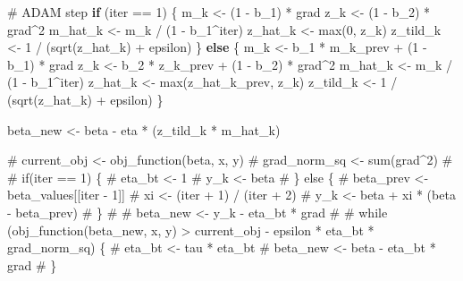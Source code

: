 \documentclass[
  letterpaper,
  DIV=11,
  numbers=noendperiod]{scrartcl}
\newenvironment{Shaded}{\begin{snugshade}}{\end{snugshade}}
\newcommand{\CommentTok}[1]{\textcolor[rgb]{0.37,0.37,0.37}{#1}}
\newcommand{\ControlFlowTok}[1]{\textcolor[rgb]{0.00,0.23,0.31}{\textbf{#1}}}
\newcommand{\DecValTok}[1]{\textcolor[rgb]{0.68,0.00,0.00}{#1}}
\newcommand{\FunctionTok}[1]{\textcolor[rgb]{0.28,0.35,0.67}{#1}}
\newcommand{\NormalTok}[1]{\textcolor[rgb]{0.00,0.23,0.31}{#1}}
\newcommand{\OtherTok}[1]{\textcolor[rgb]{0.00,0.23,0.31}{#1}}
\newcommand{\SpecialCharTok}[1]{\textcolor[rgb]{0.37,0.37,0.37}{#1}}
\begin{document}
\begin{Shaded}
\begin{Highlighting}[]
    \CommentTok{\# ADAM step}
    \ControlFlowTok{if}\NormalTok{ (iter }\SpecialCharTok{==} \DecValTok{1}\NormalTok{) \{}
\NormalTok{      m\_k }\OtherTok{\textless{}{-}}\NormalTok{ (}\DecValTok{1} \SpecialCharTok{{-}}\NormalTok{ b\_1) }\SpecialCharTok{*}\NormalTok{ grad}
\NormalTok{      z\_k }\OtherTok{\textless{}{-}}\NormalTok{ (}\DecValTok{1} \SpecialCharTok{{-}}\NormalTok{ b\_2) }\SpecialCharTok{*}\NormalTok{ grad}\SpecialCharTok{\^{}}\DecValTok{2}
\NormalTok{      m\_hat\_k }\OtherTok{\textless{}{-}}\NormalTok{ m\_k }\SpecialCharTok{/}\NormalTok{ (}\DecValTok{1} \SpecialCharTok{{-}}\NormalTok{ b\_1}\SpecialCharTok{\^{}}\NormalTok{iter)}
\NormalTok{      z\_hat\_k }\OtherTok{\textless{}{-}} \FunctionTok{max}\NormalTok{(}\DecValTok{0}\NormalTok{, z\_k)}
\NormalTok{      z\_tild\_k }\OtherTok{\textless{}{-}} \DecValTok{1} \SpecialCharTok{/}\NormalTok{ (}\FunctionTok{sqrt}\NormalTok{(z\_hat\_k) }\SpecialCharTok{+}\NormalTok{ epsilon)}
\NormalTok{    \} }\ControlFlowTok{else}\NormalTok{ \{}
\NormalTok{      m\_k }\OtherTok{\textless{}{-}}\NormalTok{ b\_1 }\SpecialCharTok{*}\NormalTok{ m\_k\_prev }\SpecialCharTok{+}\NormalTok{ (}\DecValTok{1} \SpecialCharTok{{-}}\NormalTok{ b\_1) }\SpecialCharTok{*}\NormalTok{ grad}
\NormalTok{      z\_k }\OtherTok{\textless{}{-}}\NormalTok{ b\_2 }\SpecialCharTok{*}\NormalTok{ z\_k\_prev }\SpecialCharTok{+}\NormalTok{ (}\DecValTok{1} \SpecialCharTok{{-}}\NormalTok{ b\_2) }\SpecialCharTok{*}\NormalTok{ grad}\SpecialCharTok{\^{}}\DecValTok{2}
\NormalTok{      m\_hat\_k }\OtherTok{\textless{}{-}}\NormalTok{ m\_k }\SpecialCharTok{/}\NormalTok{ (}\DecValTok{1} \SpecialCharTok{{-}}\NormalTok{ b\_1}\SpecialCharTok{\^{}}\NormalTok{iter)}
\NormalTok{      z\_hat\_k }\OtherTok{\textless{}{-}} \FunctionTok{max}\NormalTok{(z\_hat\_k\_prev, z\_k)}
\NormalTok{      z\_tild\_k }\OtherTok{\textless{}{-}} \DecValTok{1} \SpecialCharTok{/}\NormalTok{ (}\FunctionTok{sqrt}\NormalTok{(z\_hat\_k) }\SpecialCharTok{+}\NormalTok{ epsilon)}
\NormalTok{    \}}
    
\NormalTok{    beta\_new }\OtherTok{\textless{}{-}}\NormalTok{ beta }\SpecialCharTok{{-}}\NormalTok{ eta }\SpecialCharTok{*}\NormalTok{ (z\_tild\_k }\SpecialCharTok{*}\NormalTok{ m\_hat\_k)}

    \CommentTok{\# current\_obj \textless{}{-} obj\_function(beta, x, y)}
    \CommentTok{\# grad\_norm\_sq \textless{}{-} sum(grad\^{}2)}
    \CommentTok{\# }
    \CommentTok{\# if(iter == 1) \{}
    \CommentTok{\#   eta\_bt \textless{}{-} 1}
    \CommentTok{\#   y\_k \textless{}{-} beta}
    \CommentTok{\# \} else \{}
    \CommentTok{\#   beta\_prev \textless{}{-} beta\_values[[iter {-} 1]]}
    \CommentTok{\#   xi \textless{}{-} (iter + 1) / (iter + 2)}
    \CommentTok{\#   y\_k \textless{}{-} beta + xi * (beta {-} beta\_prev)}
    \CommentTok{\# \}}
    \CommentTok{\# }
    \CommentTok{\# beta\_new \textless{}{-} y\_k {-} eta\_bt * grad}
    \CommentTok{\# }
    \CommentTok{\# while (obj\_function(beta\_new, x, y) \textgreater{} current\_obj {-} epsilon * eta\_bt * grad\_norm\_sq) \{}
    \CommentTok{\#   eta\_bt \textless{}{-} tau * eta\_bt}
    \CommentTok{\#   beta\_new \textless{}{-} beta {-} eta\_bt * grad}
    \CommentTok{\# \}}
    

\end{Highlighting}
\end{Shaded}
\end{document}
